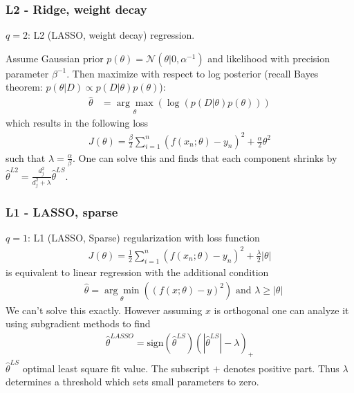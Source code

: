 \documentclass{beamer}
\begin{document}
\begin{frame}
\frametitle{L2 - Ridge, weight decay}
$q = 2$: L2 (LASSO, weight decay) regression. 

Assume Gaussian prior $p(\theta) = \mathcal{N}(\theta|0, \alpha^{-1})$ and likelihood with precision parameter $\beta^{-1}$. Then maximize with respect to log posterior (recall Bayes theorem: $p(\theta | D) \propto p(D|\theta) p ( \theta)$):
\begin{align}
\hat{\theta} & = \underset{\theta}{\arg \max} (\log (p(D|\theta) p(\theta)))
\end{align}
\pause
which results in the following loss
\begin{align}
J(\theta) = \frac{\beta}{2} \sum_{i=1}^{n} (f(x_n; \theta) - y_n)^2 + \frac{\alpha}{2} \theta^2
\end{align}
such that $\lambda = \frac{\alpha}{\beta}$. One can solve this and finds that each component shrinks by $\hat{\theta}^{L2} = \frac{d_j^2}{d_j^2 + \lambda} \hat{\theta}^{LS}$.
\end{frame}

\begin{frame}
\frametitle{L1 - LASSO, sparse}

$q = 1$: L1 (LASSO, Sparse) regularization with loss function
\begin{align}
J(\theta) = \frac{1}{2} \sum_{i=1}^{n} (f(x_n; \theta) -y_n)^2 + \frac{\lambda}{2} |\theta|
\end{align}
is equivalent to linear regression with the additional condition
\begin{align}
	&\hat{\theta} = \underset{\theta}{\arg \min} ((f(x; \theta) - y)^2)  \text{ and }  \lambda \geq  |\theta|
\end{align}
We can't solve this exactly.
\pause
However assuming $x$ is orthogonal one can analyze it using subgradient methods to find
\begin{align}
	\hat{\theta}^{LASSO} = \text{sign}(\hat{\theta}^{LS}) (|\hat{\theta}^{LS}| - \lambda)_+ 
\end{align}
$\hat{\theta}^{LS}$ optimal least square fit value. The subscript $+$ denotes positive part. Thus $\lambda$ determines a threshold which sets small parameters to zero.
\end{frame}
\end{document}

